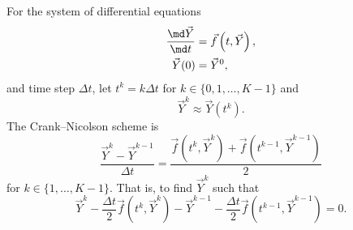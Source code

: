 \documentclass{jpmarticle}
\begin{document}
For the system of differential equations
\begin{equation}
  \begin{split}
    \frac{\md \vec{Y}}{\md t}
    &= \vec{f}\left(t, \vec{Y}\right),
    \\
    \vec{Y}(0) &= \vec{Y}^0,
  \end{split}
\end{equation}
and time step $\Delta t$, let $t^k = k \Delta t$ for
$k \in \{0, 1, \ldots, K - 1\}$ and
\begin{equation}
  \vec{Y}^k \approx \vec{Y}(t^k).
\end{equation}
The Crank--Nicolson scheme is
\begin{equation}
  \frac{\vec{Y}^k - \vec{Y}^{k - 1}}{\Delta t}
  = \frac{
    \vec{f}\left(t^k, \vec{Y}^k\right)
    + \vec{f}\left(t^{k - 1}, \vec{Y}^{k - 1}\right)
  }{2}
\end{equation}
for $k \in \{1, \ldots, K - 1\}$.
That is, to find $\vec{Y}^k$ such that
\begin{equation}
  \vec{Y}^k
  - \frac{\Delta t}{2}
  \vec{f}\left(t^k, \vec{Y}^k\right)
  - \vec{Y}^{k - 1}
  - \frac{\Delta t}{2}
  \vec{f}\left(t^{k - 1}, \vec{Y}^{k - 1}\right)
  = 0.
\end{equation}
\end{document}
